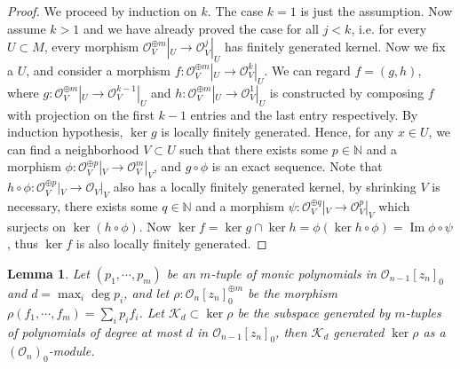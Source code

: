 \documentclass[12pt]{amsart}
\newtheorem{lem}[thm]{Lemma}
\theoremstyle{definition}
\theoremstyle{remark}
\numberwithin{equation}{section}
\newcommand{\CO}{{\mathcal O}}
\newcommand{\N}{{\mathbb{N}}}
\newcommand{\1}{{\mathbb{1}}}
\newcommand{\im}{\operatorname{Im}}
\begin{document}
\begin{proof}
We proceed by induction on $k$. The case $k= 1$ is just the assumption. Now assume $k > 1$ and we have already proved the case for all $j < k$, i.e. for every $U\subset M$, every morphism $\CO_V^{\oplus m}|_U \to \CO_V^{j}|_U$ has finitely generated kernel. Now we fix a $U$, and consider a morphism $f: \CO_V^{\oplus m}|_U \to \CO_V^{k}|_U$. We can regard $f = (g, h)$, where $g: \CO_V^{\oplus m}|_U \to \CO_V^{k - 1}|_U$ and $h: \CO_V^{\oplus m}|_U \to \CO_V^{1}|_U$ is constructed by composing $f$ with projection on the first $k - 1$ entries and the last entry respectively. By induction hypothesis, $\ker g$ is locally finitely generated. Hence, for any $x\in U$, we can find a neighborhood $V \subset U$ such that there exists some $p \in \N$ and a morphism $\phi: \CO_V^{\oplus p}|_V \to \CO_V^{m}|_V$, and $g\circ \phi$ is an exact sequence. Note that $h \circ \phi: \CO_V^{\oplus p}|_V \to \CO_V|_V$ also has a locally finitely generated kernel, by shrinking $V$ is necessary, there exists some $q \in \N$ and a morphism $\psi: \CO_V^{\oplus q}|_V \to \CO_V^{p}|_V$ which surjects on $\ker (h \circ \phi)$. Now $\ker f = \ker g \cap \ker h = \phi(\ker h\circ \phi) = \im \phi\circ \psi$, thus $\ker f$ is also locally finitely generated.
\end{proof}

\begin{lem}
Let $(p_1, \cdots, p_m)$ be an $m$-tuple of monic polynomials in $\CO_{n-1}[z_n]_0$ and $d = \max_i \deg p_i$, and let $\rho:\CO_{n}[z_n]_0^{\oplus m}$ be the morphism $\rho(f_1,\cdots, f_m) = \sum_i p_if_i$. Let $\mathcal{K}_d \subset \ker \rho$ be the subspace generated by $m$-tuples of polynomials of degree at most $d$ in $\CO_{n-1}[z_n]_0$, then $\mathcal{K}_d$ generated $\ker \rho$ as a $(\mathcal{O}_n)_0$-module. 
\end{lem}
\end{document}
